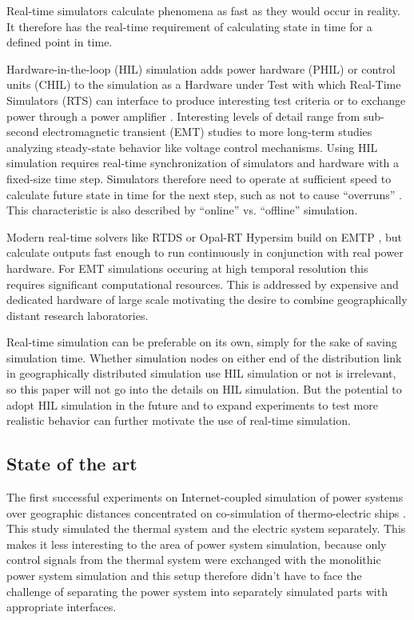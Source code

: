 \documentclass[a4paper,ngerman]{atseminar}
\begin{document}
Real-time simulators calculate phenomena as fast as they would occur in reality. It therefore has the real-time requirement of calculating state in time for a defined point in time.

Hardware-in-the-loop (HIL) simulation adds power hardware (PHIL) or control units (CHIL) to the simulation as a Hardware under Test with which Real-Time Simulators (RTS) can interface to produce interesting test criteria or to exchange power through a power amplifier \cite{deJong2012}. Interesting levels of detail range from sub-second electromagnetic transient (EMT) studies to more long-term studies analyzing steady-state behavior like voltage control mechanisms.
Using HIL simulation requires real-time synchronization of simulators and hardware with a fixed-size time step. Simulators therefore need to operate at sufficient speed to calculate future state in time for the next step, such as not to cause ``overruns'' \cite{belanger2010}. This characteristic is also described by ``online'' vs. ``offline'' simulation. 

Modern real-time solvers like RTDS \cite{rtds} or Opal-RT Hypersim \cite{opal-rt} build on EMTP \cite{dommel1964}, but calculate outputs fast enough to run continuously in conjunction with real power hardware. For EMT simulations occuring at high temporal resolution this requires significant computational resources. This is addressed by expensive and dedicated hardware of large scale motivating the desire to combine geographically distant research laboratories.

Real-time simulation can be preferable on its own, simply for the sake of saving simulation time. Whether simulation nodes on either end of the distribution link in geographically distributed simulation use HIL simulation or not is irrelevant, so this paper will not go into the details on HIL simulation. But the potential to adopt HIL simulation in the future and to expand experiments to test more realistic behavior can further motivate the use of real-time simulation.


\subsection{State of the art}
\label{MH:sec:art}



The first successful experiments on Internet-coupled simulation of power systems over geographic distances concentrated on co-simulation of thermo-electric ships \cite{faruque2009a, faruque2009b}. This study simulated the thermal system and the electric system separately. This makes it less interesting to the area of power system simulation, because only control signals from the thermal system were exchanged with the monolithic power system simulation and this setup therefore
didn't have to face the challenge of separating the power system into separately simulated parts with appropriate interfaces.
\end{document}
